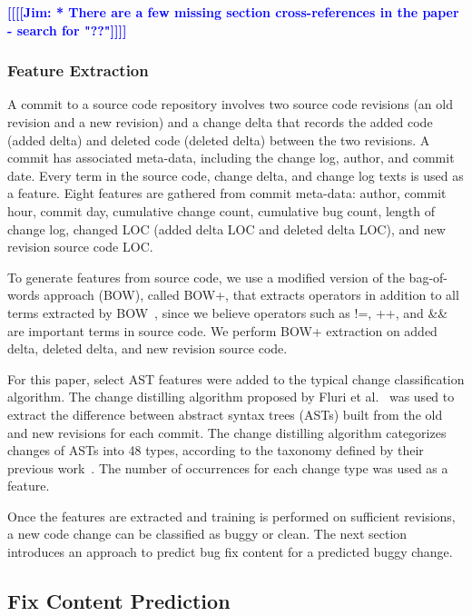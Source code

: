 \documentclass[10pt, conference, letterpaper, compsocconf]{IEEEtran}
\newcommand{\todoc}[2]{{\textcolor{#1} {\textbf{[[#2]]}}}}
\newcommand{\todored}[1]{\todoc{red}  {\textbf{[[#1]]}}}
\newcommand{\todoblue}[1]{\todoc{blue}{\textbf{[[#1]]}}}
\newcommand{\sung}[1]{\todored{Sung: #1}}
\newcommand{\jim}[1]{\todoblue{Jim: #1}}
\begin{document}
\jim{* There are a few missing section cross-references in the paper - search for "??"}


\subsubsection{Feature Extraction}
\label{FeatureExtraction} A commit to a source code repository involves
two source code revisions (an old revision and a new revision) and
a change delta that records the added code (added delta) and deleted
code (deleted delta) between the two revisions. A commit has associated
meta-data, including the change log, author, and commit date. Every
term in the source code, change delta, and change log texts is used
as a feature. Eight features are gathered from commit meta-data: author,
commit hour, commit day, cumulative change count, cumulative bug count,
length of change log, changed LOC (added delta LOC and deleted delta
LOC), and new revision source code LOC.

To generate features from source code, we use a modified version of
the bag-of-words approach (BOW), called BOW+, that extracts operators
in addition to all terms extracted by BOW~\cite{Kim2007p58}, since
we believe operators such as !=, ++, and \&\& are important terms
in source code. We perform BOW+ extraction on added delta, deleted
delta, and new revision source code.

For this paper, select AST features were added to the typical change
classification algorithm. The change distilling algorithm proposed by
Fluri et al.~\cite{Fluri2007} was used to extract the difference between abstract
syntax trees (ASTs) built from the old and new revisions for each commit. The change distilling algorithm categorizes changes
of ASTs into 48 types, according to the taxonomy defined by their
previous work~\cite{Fluri2006}. The number of occurrences
for each change type was used as a feature.

Once the features are extracted and training is performed on sufficient revisions, a new code change can be classified as buggy or clean. The next section introduces
an approach to predict bug fix content for a predicted buggy change.


\subsection{Fix Content Prediction}
\label{FixPred} 
\end{document}
